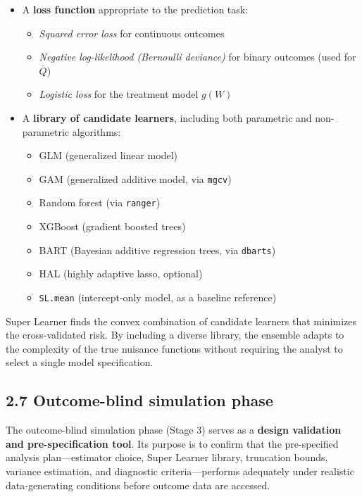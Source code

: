 \documentclass[
  letterpaper,
  DIV=11,
  numbers=noendperiod]{scrartcl}
\providecommand{\tightlist}{%
  \setlength{\itemsep}{0pt}\setlength{\parskip}{0pt}}\usepackage{longtable,booktabs,array}
\begin{document}
\begin{itemize}
\tightlist
\item
  A \textbf{loss function} appropriate to the prediction task:

  \begin{itemize}
  \tightlist
  \item
    \emph{Squared error loss} for continuous outcomes
  \item
    \emph{Negative log-likelihood (Bernoulli deviance)} for binary
    outcomes (used for \(\bar{Q}\))
  \item
    \emph{Logistic loss} for the treatment model \(g(W)\)
  \end{itemize}
\item
  A \textbf{library of candidate learners}, including both parametric
  and non-parametric algorithms:

  \begin{itemize}
  \tightlist
  \item
    GLM (generalized linear model)
  \item
    GAM (generalized additive model, via \texttt{mgcv})
  \item
    Random forest (via \texttt{ranger})
  \item
    XGBoost (gradient boosted trees)
  \item
    BART (Bayesian additive regression trees, via \texttt{dbarts})
  \item
    HAL (highly adaptive lasso, optional)
  \item
    \texttt{SL.mean} (intercept-only model, as a baseline reference)
  \end{itemize}
\end{itemize}

Super Learner finds the convex combination of candidate learners that
minimizes the cross-validated risk. By including a diverse library, the
ensemble adapts to the complexity of the true nuisance functions without
requiring the analyst to select a single model specification.

\subsection{2.7 Outcome-blind simulation
phase}\label{outcome-blind-simulation-phase}

The outcome-blind simulation phase (Stage 3) serves as a \textbf{design
validation and pre-specification tool}. Its purpose is to confirm that
the pre-specified analysis plan---estimator choice, Super Learner
library, truncation bounds, variance estimation, and diagnostic
criteria---performs adequately under realistic data-generating
conditions before outcome data are accessed.
\end{document}
